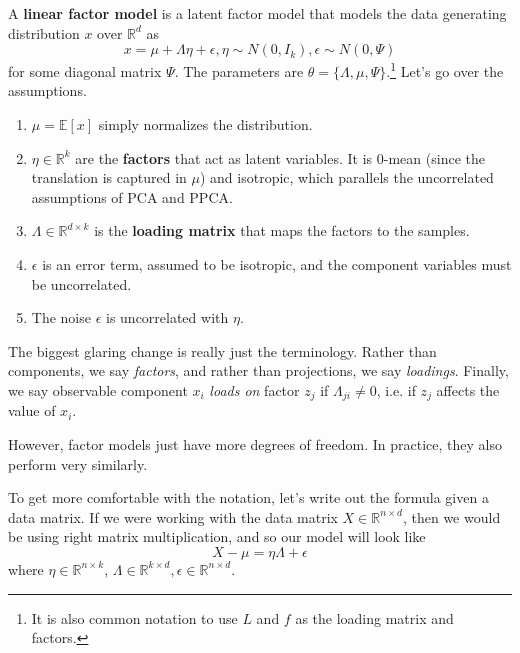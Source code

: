   \begin{definition} 
    A \textbf{linear factor model} is a latent factor model that models the data generating distribution $x$ over $\mathbb{R}^d$ as 
    \begin{equation}
      x = \mu + \Lambda \eta + \epsilon, \eta \sim N(0, I_k), \epsilon \sim N(0, \Psi)
    \end{equation}
    for some diagonal matrix $\Psi$. The parameters are $\theta = \{\Lambda, \mu, \Psi\}$.\footnote{It is also common notation to use $L$ and $f$ as the loading matrix and factors.} Let's go over the assumptions. 
    \begin{enumerate}
      \item $\mu = \mathbb{E}[x]$ simply normalizes the distribution. 
      \item $\eta \in \mathbb{R}^k$ are the \textbf{factors} that act as latent variables. It is $0$-mean (since the translation is captured in $\mu$) and isotropic, which parallels the uncorrelated assumptions of PCA and PPCA. 
      \item $\Lambda \in \mathbb{R}^{d \times k}$ is the \textbf{loading matrix} that maps the factors to the samples. 
      \item $\epsilon$ is an error term, assumed to be isotropic, and the component variables must be uncorrelated. 
      \item The noise $\epsilon$ is uncorrelated with $\eta$. 
    \end{enumerate}
  \end{definition} 

  The biggest glaring change is really just the terminology. Rather than components, we say \textit{factors}, and rather than projections, we say \textit{loadings}. Finally, we say observable component $x_i$ \textit{loads on} factor $z_j$ if $\Lambda_{ji} \neq 0$, i.e. if $z_j$ affects the value of $x_i$. 

  However, factor models just have more degrees of freedom. In practice, they also perform very similarly. 

  To get more comfortable with the notation, let's write out the formula given a data matrix. If we were working with the data matrix $X \in \mathbb{R}^{n \times d}$, then we would be using right matrix multiplication, and so our model will look like 
  \begin{equation}
    X - \mu = \eta \Lambda + \epsilon
  \end{equation}
  where $\eta \in \mathbb{R}^{n \times k}$, $\Lambda \in \mathbb{R}^{k \times d}, \epsilon \in \mathbb{R}^{n \times d}$. 

